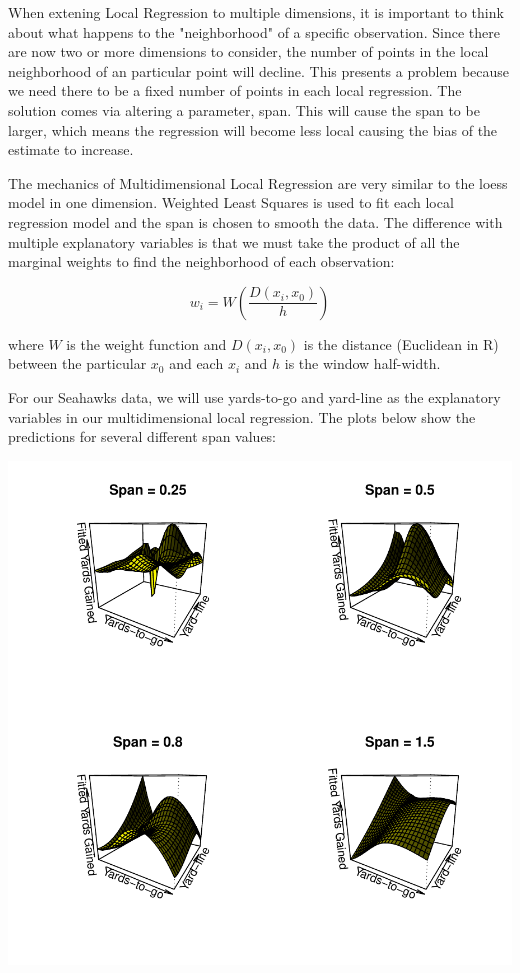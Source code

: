 \documentclass{article}
\begin{document}
When extening Local Regression to multiple dimensions, it is important to think about what happens to the "neighborhood" of a specific observation. Since there are now two or more dimensions to consider, the number of points in the local neighborhood of an particular point will decline. This presents a problem because we need there to be a fixed number of points in each local regression. The solution comes via altering a parameter, span. This will cause the span to be larger, which means the regression will become less local causing the bias of the estimate to increase. 

The mechanics of Multidimensional Local Regression are very similar to the loess model in one dimension. Weighted Least Squares is used to fit each local regression model and the span is chosen to smooth the data. The difference with multiple explanatory variables is that we must take the product of all the marginal weights to find the neighborhood of each observation:

$$w_{i} = W(\frac{D(x_{i}, x_{0})}{h})$$

where $W$ is the weight function and $D(x_{i}, x_{0})$ is the distance (Euclidean in R) between the particular $x_{0}$ and each $x_{i}$ and $h$ is the window half-width. 

\vspace{5mm}

For our Seahawks data, we will use yards-to-go and yard-line as the explanatory variables in our multidimensional local regression. The plots below show the predictions for several different span values:

\vspace{1cm}

\includegraphics{project4-013}
\end{document}
